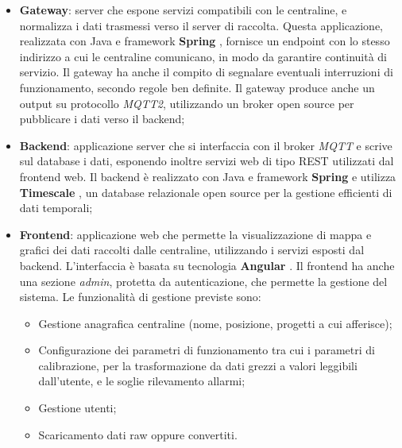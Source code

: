 \begin{itemize}
  \item \textbf{Gateway}: server che espone servizi compatibili con le centraline, e normalizza i dati trasmessi verso il server di raccolta. Questa applicazione, realizzata con Java e framework \textbf{Spring} \cite{spring}, fornisce un endpoint con lo stesso indirizzo a cui le centraline comunicano, in modo da garantire continuità di servizio. Il gateway ha anche il compito di segnalare eventuali interruzioni di funzionamento, secondo regole ben definite. Il gateway produce anche un output su protocollo \textit{MQTT2}, utilizzando un broker open source per pubblicare i dati verso il backend;
  \item \textbf{Backend}: applicazione server che si interfaccia con il broker \textit{MQTT} e scrive sul database i dati, esponendo inoltre servizi web di tipo REST utilizzati dal frontend web. Il backend è realizzato con Java e framework \textbf{Spring} \cite{spring} e utilizza \textbf{Timescale} \cite{timescale}, un database relazionale open source per la gestione efficienti di dati temporali;
  \item \textbf{Frontend}: applicazione web che permette la visualizzazione di mappa e grafici dei dati raccolti dalle centraline, utilizzando i servizi esposti dal backend. L'interfaccia è basata su tecnologia \textbf{Angular} \cite{angular}. Il frontend ha anche una sezione \textit{admin}, protetta da autenticazione, che permette la gestione del sistema. Le funzionalità di gestione previste sono:
    \begin{itemize}
      \item Gestione anagrafica centraline (nome, posizione, progetti a cui afferisce);
      \item Configurazione dei parametri di funzionamento tra cui i parametri di calibrazione, per la trasformazione da dati grezzi a valori leggibili dall’utente, e le soglie rilevamento allarmi;
      \item Gestione utenti;
      \item Scaricamento dati raw oppure convertiti. \cite{airqino}
    \end{itemize}
\end{itemize}

